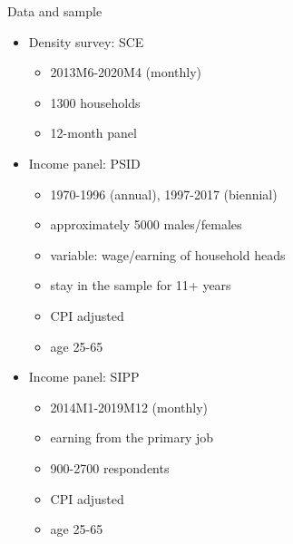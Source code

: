 \documentclass{beamer}
\begin{document}
\begin{frame}{Data and sample}
	\begin{itemize}
		\item Density survey: SCE
		\begin{itemize}
			\item 2013M6-2020M4   (monthly)
			\item 1300 households 
			\item 12-month panel 
		\end{itemize}
\item Income panel: PSID 
\begin{itemize}
	\item 1970-1996 (annual), 1997-2017 (biennial) 
	\item approximately 5000 males/females 
	\item variable: wage/earning of household heads 
	\item stay in the sample for 11+ years
	\item CPI adjusted 
	\item age 25-65 
\end{itemize}
\item Income panel: SIPP
\begin{itemize}
	\item 2014M1-2019M12 (monthly)
	\item earning from the primary job 
	\item 900-2700 respondents 
		\item CPI adjusted 
	\item age 25-65 

\end{itemize}
\end{itemize}
\end{frame}


\end{document}
